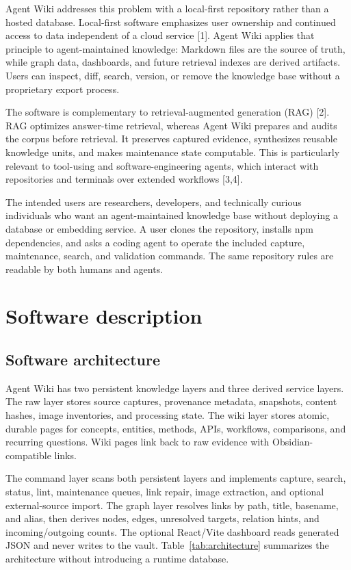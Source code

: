 \documentclass[preprint,12pt,a4paper]{elsarticle}
\begin{document}
Agent Wiki addresses this problem with a local-first repository rather than a
hosted database. Local-first software emphasizes user ownership and continued
access to data independent of a cloud service [1]. Agent Wiki applies that
principle to agent-maintained knowledge: Markdown files are the source of truth,
while graph data, dashboards, and future retrieval indexes are derived
artifacts. Users can inspect, diff, search, version, or remove the knowledge
base without a proprietary export process.

The software is complementary to retrieval-augmented generation (RAG) [2]. RAG
optimizes answer-time retrieval, whereas Agent Wiki prepares and audits the
corpus before retrieval. It preserves captured evidence, synthesizes reusable
knowledge units, and makes maintenance state computable. This is particularly
relevant to tool-using and software-engineering agents, which interact with
repositories and terminals over extended workflows [3,4].

The intended users are researchers, developers, and technically curious
individuals who want an agent-maintained knowledge base without deploying a
database or embedding service. A user clones the repository, installs npm
dependencies, and asks a coding agent to operate the included capture,
maintenance, search, and validation commands. The same repository rules are
readable by both humans and agents.

\section{Software description}

\subsection{Software architecture}

Agent Wiki has two persistent knowledge layers and three derived service
layers. The raw layer stores source captures, provenance metadata, snapshots,
content hashes, image inventories, and processing state. The wiki layer stores
atomic, durable pages for concepts, entities, methods, APIs, workflows,
comparisons, and recurring questions. Wiki pages link back to raw evidence with
Obsidian-compatible links.

The command layer scans both persistent layers and implements capture, search,
status, lint, maintenance queues, link repair, image extraction, and optional
external-source import. The graph layer resolves links by path, title, basename,
and alias, then derives nodes, edges, unresolved targets, relation hints, and
incoming/outgoing counts. The optional React/Vite dashboard reads generated
JSON and never writes to the vault. Table~\ref{tab:architecture} summarizes the
architecture without introducing a runtime database.
\end{document}
